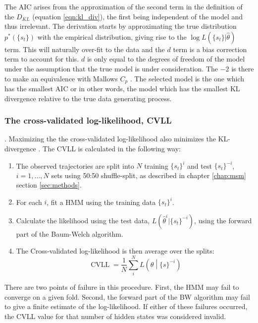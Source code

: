 The AIC arises from the approximation of the second term in the definition of the $D_{KL}$ (equation \ref{eqn:kl_div}), the first being independent of the model and thus irrelevant. The derivation starts by approximating the true distribution $p^{*}(\{s_t\})$ with the empirical distribution, giving rise to the $\log{L\left(\{s_t\}|\hat{\theta}\right)}$ term.  This will naturally over-fit to the data and the  $d$ term is a bias correction term to account for this.  $d$ is only equal to the degrees of freedom of the model under the assumption that the true model is under consideration. The $-2$ is there to make an equivalence with Mallows $C_p$ \cite{friedman2001elements}. The selected model is the one which has the smallest AIC or in other words, the model which has the smallest KL divergence relative to the true data generating process. 

\subsubsection{The cross-validated log-likelihood, CVLL}. 
Maximizing the the cross-validated log-likelihood also minimizes the KL-divergence \cite{celeuxSelectingHiddenMarkov2008}. The CVLL is calculated in the following way: 
\begin{enumerate}
    \item The observed trajectories are split into $N$ training $\{s_t\}^{i}$ and test $\{s_t\}^{-i}$, $i = 1, ..., N$ sets using 50:50 shuffle-split, as described in chapter \ref{chap:msm} section \ref{sec:methods}. 
    \item For each $i$, fit a HMM using the training data $\{s_t\}^{i}$. 
    \item Calculate the likelihood using the test data,  $L(\hat{\theta}^{i}|\{s_t\}^{-i})$, using the forward part of the Baum-Welch algorithm. 
    \item The Cross-validated log-likelihood is then average over the splits: 
    \begin{equation}
        \operatorname{CVLL} = \frac{1}{N}\sum_{i}^{N}L\left(\theta \middle |\{s\}^{-i}\right)
    \end{equation}
\end{enumerate}
There are two points of failure in this procedure. First, the HMM may fail to converge on a given fold. Second, the forward part of the BW algorithm may fail to give a finite estimate of the log-likelihood. If either of these failures occurred, the CVLL value for that number of hidden states was considered invalid.  

